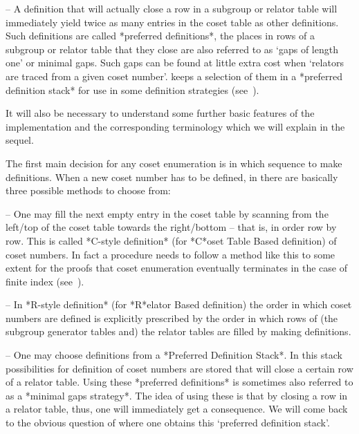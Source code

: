 \item{--} A definition that will actually close a row in a subgroup or
relator table will immediately yield twice  as  many  entries  in  the
coset  table  as  other  definitions.  Such  definitions  are   called
*preferred definitions*,  the  places  in
rows of a subgroup or relator table that they close are also  referred
to as \lq{}gaps of length one' or minimal gaps. Such gaps can be found
at little extra cost when \lq{}relators are traced from a given  coset
number'. {\ACE} keeps a selection of them in a  *preferred  definition
stack* for use  in  some  definition
strategies (see~\cite{Hav91}).

\endlist

It will also be necessary to understand some further basic features of
the  implementation and  the corresponding  terminology which  we will
explain in the sequel.


The first main decision for any coset enumeration is in which sequence
to make definitions. When a new coset number has  to  be  defined,  in
{\ACE} there are basically three possible methods to choose from:

\beginlist

\item{--} One may fill the next empty entry  in  the  coset  table  by
scanning from the left/top of the coset table towards the right/bottom
--  that  is,  in  order  row  by  row.  This   is   called   *C-style
definition*   (for
*C*oset Table Based definition) of coset numbers. In fact a  procedure
needs to follow a method like this to some extent for the proofs  that
coset enumeration eventually terminates in the case  of  finite  index
(see~\cite{Neu82}).

\item{--} In *R-style definition* (for *R*elator Based definition) the order in which  coset
numbers are defined is explicitly prescribed by  the  order  in  which
rows of (the subgroup generator tables and)  the  relator  tables  are
filled by making definitions.

\item{--} One may choose  definitions  from  a  *Preferred  Definition
Stack*. In this stack  possibilities
for definition of coset numbers are stored that will close  a  certain
row    of    a    relator    table.     Using     these     *preferred
definitions* is sometimes  also  referred
to as a *minimal gaps  strategy*.  The
idea of using these is that by closing a row in a relator table, thus,
one will immediately get a consequence.  We  will  come  back  to  the
obvious question of where one obtains this  \lq{}preferred  definition
stack'.

